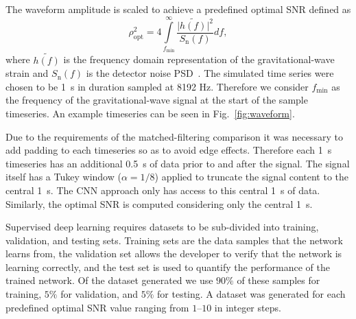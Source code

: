 \documentclass[%
showpacs,
 amsmath,amssymb,
 aps,
 twocolumn,
 prl,
 reprint,
floatfix,
]{revtex4-1}
\newcommand{\fergus}[1]{\textbf{\textcolor{cyan}{FERGUS: #1}}}
\begin{document}

%
%
The waveform amplitude is scaled to achieve a predefined optimal \ac{SNR}
defined as
%
%
\begin{equation}\label{eq:snr} 
\rho_{\mathrm{opt}}^{2} = 4
\int\limits_{f_{\mathrm{min}}}^{\infty} \frac{\lvert
\tilde{h(f)}\rvert^{2}}{S_{\mathrm{n}}(f)} df,
\end{equation}
%
where $\tilde{h(f)}$ is the frequency domain representation of the
gravitational-wave strain and $S_{\mathrm{n}}(f)$ is the detector noise
\ac{PSD}~\cite{0264-9381-23-18-002}. The simulated time series were chosen to be 1~s in duration sampled
at 8192 Hz. Therefore we consider $f_{\mathrm{min}}$ as the frequency of the
gravitational-wave signal at the start of the sample timeseries. An example
timeseries can be seen in Fig.~\ref{fig:waveform}. 

%
%
Due to the requirements of the matched-filtering comparison it was necessary to
add padding to each timeseries so as to avoid edge effects. Therefore
each 1~s timeseries has an additional 0.5~s of data prior to and after the signal.
The signal itself has a Tukey window ($\alpha=1/8$) applied to truncate the
signal content to the central 1~s. The \ac{CNN} approach only has access to
this central 1~s of data. Similarly, the optimal \ac{SNR} is computed considering
only the central 1~s.

%
%
Supervised deep learning requires datasets to be sub-divided into training,
validation, and testing sets. Training sets are the data samples that the
network learns from, the validation set allows the developer to verify that the
network is learning correctly, and the test set is used to quantify the
performance of the trained network.  Of the dataset generated we use $90\%$ of
these samples for training, $5\%$ for validation, and $5\%$ for testing. A
dataset was generated for each predefined optimal \ac{SNR} value ranging
from $1$--$10$ in integer steps. 
\end{document}
